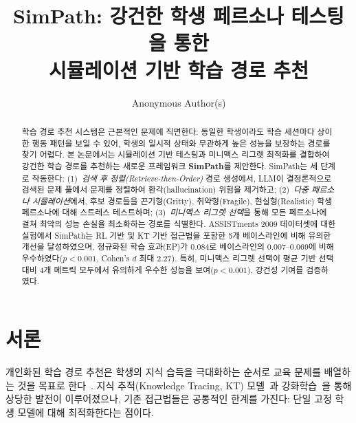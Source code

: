 \documentclass[runningheads]{llncs}
\begin{document}
\title{SimPath: 강건한 학생 페르소나 테스팅을 통한\\시뮬레이션 기반 학습 경로 추천}

\author{Anonymous Author(s)}

\maketitle

\begin{abstract}
학습 경로 추천 시스템은 근본적인 문제에 직면한다: 동일한 학생이라도 학습 세션마다 상이한 행동 패턴을 보일 수 있어, 학생의 일시적 상태와 무관하게 높은 성능을 보장하는 경로를 찾기 어렵다.
본 논문에서는 시뮬레이션 기반 테스팅과 미니맥스 리그렛 최적화를 결합하여 강건한 학습 경로를 추천하는 새로운 프레임워크 \textbf{SimPath}를 제안한다.
SimPath는 세 단계로 작동한다: (1)~\emph{검색 후 정렬(Retrieve-then-Order)} 경로 생성에서, LLM이 결정론적으로 검색된 문제 풀에서 문제를 정렬하여 환각(hallucination) 위험을 제거하고; (2)~\emph{다중 페르소나 시뮬레이션}에서, 후보 경로들을 끈기형(Gritty), 취약형(Fragile), 현실형(Realistic) 학생 페르소나에 대해 스트레스 테스트하며; (3)~\emph{미니맥스 리그렛 선택}을 통해 모든 페르소나에 걸쳐 최악의 성능 손실을 최소화하는 경로를 식별한다.
ASSISTments 2009 데이터셋에 대한 실험에서 SimPath는 RL 기반 및 KT 기반 접근법을 포함한 5개 베이스라인에 비해 유의한 개선을 달성하였으며, 정규화된 학습 효과(EP)가 0.084로 베이스라인의 0.007--0.069에 비해 우수하였다($p<0.001$, Cohen's $d$ 최대 2.27).
특히, 미니맥스 리그렛 선택이 평균 기반 선택 대비 4개 메트릭 모두에서 유의하게 우수한 성능을 보여($p<0.001$), 강건성 기여를 검증하였다.
\end{abstract}


\section{서론}

개인화된 학습 경로 추천은 학생의 지식 습득을 극대화하는 순서로 교육 문제를 배열하는 것을 목표로 한다~\cite{cseal2019,src2023}.
지식 추적(Knowledge Tracing, KT) 모델~\cite{dkt2015,akt2021}과 강화학습~\cite{cseal2019}을 통해 상당한 발전이 이루어졌으나, 기존 접근법들은 공통적인 한계를 가진다: 단일 고정 학생 모델에 대해 최적화한다는 점이다.
\end{document}
